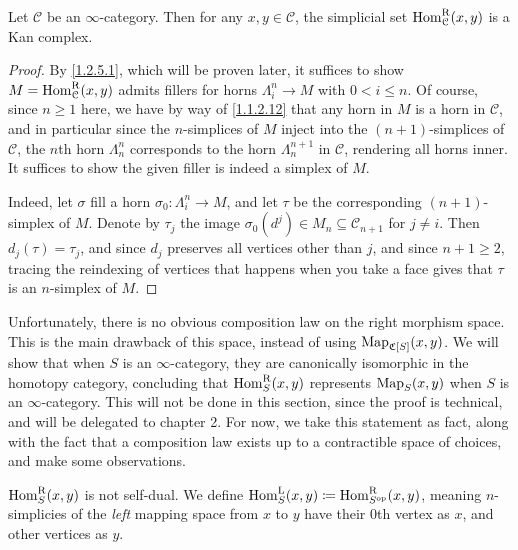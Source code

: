 \begin{proposition}\label{1.2.2.3}
	Let $\mathcal{C} $ be an $\infty $-category. Then for any $x,y\in \mathcal{C} $, the simplicial set $\operatorname{Hom}_\mathcal{C} ^\mathrm{R} (x,y)$ is a Kan complex.
\end{proposition}
\begin{proof}
	By \cref{1.2.5.1}, which will be proven later, it suffices to show $M=\operatorname{Hom}_\mathcal{C} ^\mathrm{R} (x,y)$ admits fillers for horns $\Lambda _i^n\to M$ with $0<i\leq n$. Of course, since $n\geq 1$ here, we have by way of \cref{1.1.2.12} that any horn in $M$ is a horn in $\mathcal{C} $, and in particular since the $n$-simplices of $M$ inject into the $(n+1)$-simplices of $\mathcal{C} $, the $n$th horn $\Lambda _n^n$ corresponds to the horn $\Lambda _n^{n+1} $ in $\mathcal{C} $, rendering all horns inner. It suffices to show the given filler is indeed a simplex of $M$.

	Indeed, let $\sigma $ fill a horn $\sigma _0: \Lambda _i^n \to M$, and let $\tau $ be the corresponding $(n+1)$-simplex of $M$. Denote by $\tau _j$ the image $\sigma _0(d^j)\in M_n\subseteq \mathcal{C} _{n+1} $ for $j\neq i$. Then $d_j(\tau )=\tau _j$, and since $d_j$ preserves all vertices other than $j$, and since $n+1\geq 2$, tracing the reindexing of vertices that happens when you take a face gives that $\tau $ is an $n$-simplex of $M$.
\end{proof}

Unfortunately, there is no obvious composition law on the right morphism space. This is the main drawback of this space, instead of using $\operatorname{Map}_{\mathfrak{C} [S]} (x,y)$. We will show that when $S$ is an $\infty $-category, they are canonically isomorphic in the homotopy category, concluding that $\operatorname{Hom}_S^\mathrm{R} (x,y)$ represents $\operatorname{Map}_S(x,y)$ when $S$ is an $\infty $-category. This will not be done in this section, since the proof is technical, and will be delegated to chapter 2. For now, we take this statement as fact, along with the fact that a composition law exists up to a contractible space of choices, and make some observations.

\begin{remark}\label{1.2.2.4}
	$\operatorname{Hom}_S^\mathrm{R} (x,y)$ is not self-dual. We define $\operatorname{Hom}_S^\mathrm{L} (x,y)\coloneqq \operatorname{Hom}_{S^{\mathrm{op}} } ^\mathrm{R} (x,y)$, meaning $n$-simplicies of the \emph{left} mapping space from $x$ to $y$ have their 0th vertex as $x$, and other vertices as $y$.
\end{remark}

